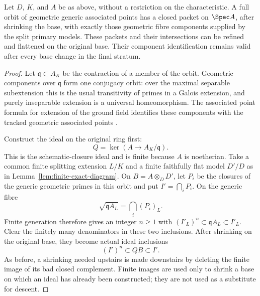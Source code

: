 \begin{lemma}
\label{lem:power-certified-packets}
Let \(D\), \(K\), and \(A\) be as above, without a restriction
on the characteristic.  A full orbit of geometric generic associated
points has a closed packet on \(\Spec A\), after shrinking the
base, with exactly those geometric fibre components supplied by the
split primary models.  These packets and their intersections can be
refined and flattened on the original base.  Their component
identification remains valid after every base change in the final
stratum.
\end{lemma}
\begin{proof}
Let \(\mathfrak q\subset A_K\) be the contraction of a member of
the orbit.  Geometric components over \(\mathfrak q\) form one
conjugacy orbit: over the maximal separable subextension this is the
usual transitivity of primes in a Galois extension, and purely
inseparable extension is a universal homeomorphism.  The associated
point formula for extension of the ground field identifies these
components with the tracked geometric associated points
\cite[Section 31.7]{StacksRelativeAssassin}.

Construct the ideal on the original ring first:
\[
 Q=\ker(A\longrightarrow A_K/\mathfrak q).
\]
This is the schematic-closure ideal and is finite because \(A\)
is noetherian.  Take a common finite splitting extension \(L/K\)
and a finite faithfully flat model \(D'/D\) as in
Lemma~\ref{lem:finite-exact-diagram}.  On \(B=A\otimes_DD'\),
let \(P_i\) be the closures of the generic geometric primes in
this orbit and put \(I'=\bigcap_iP_i\).  On the generic fibre
\[
 \sqrt{\mathfrak q A_L}=\bigcap_i(P_i)_L.
\]
Finite generation therefore gives an integer \(n\ge1\) with
\((I'_L)^n\subset\mathfrak q A_L\subset I'_L\).
Clear the finitely many denominators in these two inclusions.  After
shrinking on the original base, they become actual ideal inclusions
\begin{equation}\label{eq:packet-power-sandwich}
 (I')^n\subset QB\subset I'.
\end{equation}
As before, a shrinking needed upstairs is made downstairs by deleting
the finite image of its bad closed complement.  Finite images are used
only to shrink a base on which an ideal has already been constructed;
they are not used as a substitute for descent.


\end{proof}
